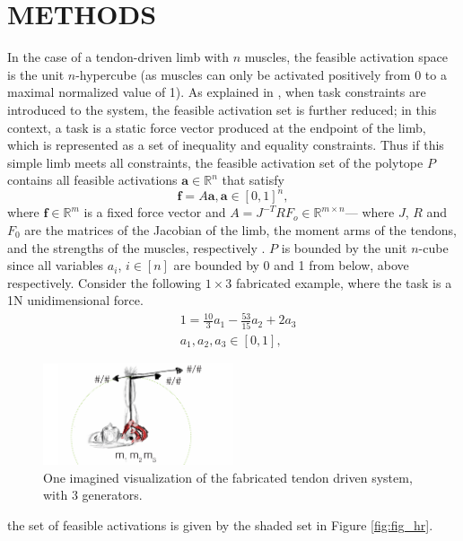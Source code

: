 \section{METHODS}
In the case of a tendon-driven limb with $n$ muscles, the feasible activation space is the unit $n$-hypercube (as muscles can only be activated positively from 0 to a maximal normalized value of 1). As explained in \cite{Valero-Cuevas2009mathematical}, when task constraints are introduced to the system, the feasible activation set is further reduced; in this context, a task is a static force vector produced at the endpoint of the limb, which is represented as a set of inequality and equality constraints. Thus if this simple limb meets all constraints, the feasible activation set of the polytope $P$ contains all feasible activations  $\textbf{a} \in \mathbb{R}^n$ that satisfy
\[\textbf{f} = A\textbf{a}, \textbf{a} \in [0,1]^n,\]
where $\textbf{f} \in \mathbb{R}^m$ is a fixed force vector and $A = J^{-T}RF_o \in \mathbb{R}^{m \times n}$--- where $J$, $R$ and $F_0$ are the matrices of the Jacobian of the limb, the moment arms of the tendons, and the strengths of the muscles, respectively \cite{Valero-Cuevas1998Large,Valero-Cuevas2009mathematical}. $P$ is bounded by the unit $n$-cube since all variables $a_i$, $i \in [n]$ are bounded by 0 and 1 from below, above respectively. 
Consider the following $1 \times 3$ fabricated example, where the task is a 1N unidimensional force.
\begin{align*}
&1 = \frac{10}{3}a_1 - \frac{53}{15}a_2 + 2a_3 \\
&a_1, a_2, a_3 \in [0,1],
\end{align*}



\begin{figure}[schematic_arm]
  \label{fig:schematic_arm}
  \centering
  \includegraphics[width=0.5\textwidth]{sections/figs/schematic_example_drawing.pdf}
  \caption{One imagined visualization of the fabricated tendon driven system, with 3 generators.}
  \label{fig:finger}
\end{figure}


the set of feasible activations is given by the shaded set in Figure \ref{fig:fig_hr}.

